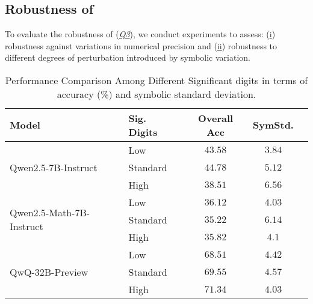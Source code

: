 \subsection{Robustness of \name}


To evaluate the robustness of \name (\textit{\underline{Q3}}), we conduct experiments to assess: (\underline{i}) robustness against variations in numerical precision and (\underline{ii}) robustness to different degrees of perturbation introduced by symbolic variation.




\begin{table}[ht!]
\centering
\small
\caption{Performance Comparison Among Different Significant digits in terms of accuracy (\%) and symbolic standard deviation.}
    \label{tab:sig_dig_comparison}
    \begin{adjustbox}{max width=0.5\textwidth}
    \begin{tabular}{llccc}
    \toprule
    \textbf{Model} & \textbf{Sig. Digits} & \textbf{Overall Acc} & \textbf{SymStd.} \\
    \midrule
    \multirow{3}{*}{Qwen2.5-7B-Instruct}
    & Low & $43.58$ & $3.84$ \\
    & \cellcolor{skyblue}Standard & \cellcolor{skyblue}$44.78$ & \cellcolor{skyblue}$5.12$ \\
    & High & $38.51$ & $6.56$ \\
    \midrule
    \multirow{3}{*}{Qwen2.5-Math-7B-Instruct}
    & \cellcolor{skyblue}Low & \cellcolor{skyblue}$36.12$ &\cellcolor{skyblue} $4.03$ \\
    & Standard & $35.22$ & $6.14$ \\
    & \cellcolor{skyblue}High & \cellcolor{skyblue}$35.82$ & \cellcolor{skyblue}$4.1$ \\
    \midrule
    \multirow{3}{*}{QwQ-32B-Preview}
    & Low & $68.51$ & $4.42$ \\
    & \cellcolor{skyblue}Standard & \cellcolor{skyblue}$69.55$ & \cellcolor{skyblue}$4.57$ \\
    & High & $71.34$ & $4.03$ \\
    \bottomrule
    \end{tabular}
    \end{adjustbox}
\end{table}


